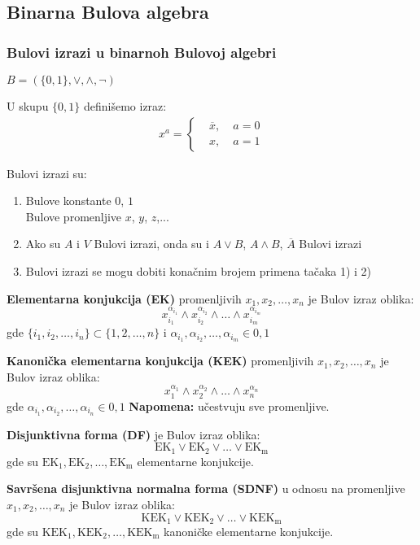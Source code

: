 \subsection{Binarna Bulova algebra}
\subsubsection{Bulovi izrazi u binarnoh Bulovoj algebri}
	$B=(\{0, 1\}, \lor, \land, \neg)$
	\begin{definition}
		U skupu $\{0, 1\}$ definišemo izraz:
		\begin{align*}
			x^a = \left\{
			\begin{aligned}
				&\overline{x}, \; &a = 0\\
				&x, \; &a = 1
			\end{aligned}
			\right.
		\end{align*}
	\end{definition}
	\begin{definition}
		Bulovi izrazi su:
		\begin{enumerate}[label = \arabic*)]
			\item
				Bulove konstante $0$, $1$\\
				Bulove promenljive $x$, $y$, $z$,...
			\item
				Ako su $A$ i $V$ Bulovi izrazi, onda su i $A \lor B$, $A \land B$, $\overline{A}$ Bulovi izrazi
			\item
				Bulovi izrazi se mogu dobiti konačnim brojem primena tačaka 1) i 2)
		\end{enumerate}
	\end{definition}
	\begin{definition}
		\textbf{Elementarna konjukcija (EK)} promenljivih $x_1, x_2,\ldots, x_n$ je Bulov izraz oblika:
		$$x_{i_1}^{\alpha_{i_1}} \land x_{i_2}^{\alpha_{i_2}} \land \ldots \land x_{i_m}^{\alpha_{i_m}}$$
		gde $\{i_1, i_2, \ldots, i_n\} \subset \{1, 2, \ldots, n\}$ i  $\alpha_{i_1}, \alpha_{i_2}, \ldots, \alpha_{i_m} \in {0,1}$
	\end{definition}
	\begin{definition}
		\textbf{Kanonička elementarna konjukcija (KEK)} promenljivih $x_1, x_2,\ldots, x_n$ je Bulov izraz oblika:
		$$x_1^{\alpha_1} \land x_2^{\alpha_2} \land \ldots \land x_n^{\alpha_n}$$
		gde $\alpha_{i_1}, \alpha_{i_2}, \ldots, \alpha_{i_n} \in {0,1}$
		\textbf{Napomena:} učestvuju sve promenljive.
	\end{definition}
	\begin{definition}
		\textbf{Disjunktivna forma (DF)} je Bulov izraz oblika:
		$$\mathrm{EK_1} \lor \mathrm{EK_2} \lor \ldots \lor \mathrm{EK_m}$$
		gde su $\mathrm{EK_1}, \mathrm{EK_2}, \ldots, \mathrm{EK_m}$ elementarne konjukcije. 
	\end{definition}
	\begin{definition}
		\textbf{Savršena disjunktivna normalna forma (SDNF)} u odnosu na promenljive $x_1, x_2,\ldots, x_n$ je Bulov izraz oblika:
		$$\mathrm{KEK_1} \lor \mathrm{KEK_2} \lor \ldots \lor \mathrm{KEK_m}$$
		gde su $\mathrm{KEK_1}, \mathrm{KEK_2}, \ldots, \mathrm{KEK_m}$ kanoničke elementarne konjukcije. 
	\end{definition}
	
